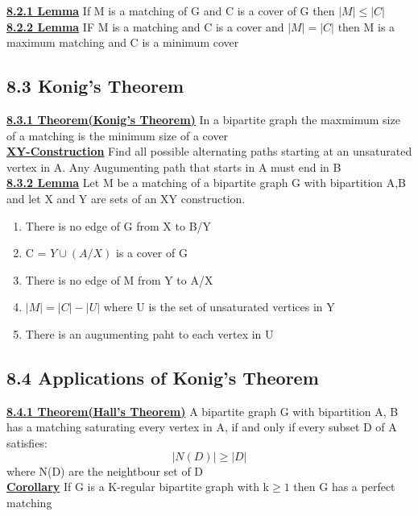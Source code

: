 \documentclass[12pt]{article}
\newcommand{\myt}[1]{\textbf{\underline{#1}}}
\begin{document}
	\myt{8.2.1 Lemma} If M is a matching of G and C is a cover of G then $|M| \leq |C|$\\
	
	\myt{8.2.2 Lemma} IF M is a matching and C is a cover and $|M| = |C|$ then M is a maximum matching and C is a minimum cover\\
	
	\subsection*{8.3 Konig's Theorem}
	\myt{8.3.1 Theorem(Konig's Theorem)} In a bipartite graph the maxmimum size of a matching is the minimum size of a cover\\
	
	\myt{XY-Construction} Find all possible alternating paths starting at an unsaturated vertex in A. Any Augumenting path that starts in A must end in B\\
	
	\myt{8.3.2 Lemma} Let M be a matching of a bipartite graph G with bipartition A,B and let X and Y are sets of an XY construction.\\
	\begin{enumerate}
		\item There is no edge of G from X to B/Y
		\item C = $Y \cup (A/X)$ is a cover of G
		\item There is no edge of M from Y to A/X
		\item $|M| = |C| - |U|$ where U is the set of unsaturated vertices in Y
		\item There is an augumenting paht to each vertex in U
	\end{enumerate}
	
	\subsection*{8.4 Applications of Konig's Theorem}
	\myt{8.4.1 Theorem(Hall's Theorem)} A bipartite graph G with bipartition A, B has a matching saturating every vertex in A, if and only if every subset D of A satisfies:\\
	$$|N(D)| \geq |D|$$
	where N(D) are the neightbour set of D\\
	
	\myt{Corollary} If G is a K-regular bipartite graph with k$\geq 1$ then G has a perfect matching\\
	
	

	
\end{document}
